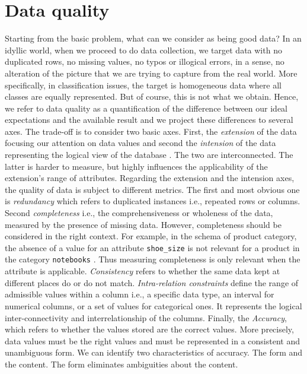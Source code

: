 \documentclass{article}
\begin{document}
\section{Data quality} %
\label{sec:Data quality}
Starting from the basic problem, what can we consider as being good data?
In an idyllic world, when we proceed to do data collection, we target data with no duplicated rows, no missing values, no typos or illogical errors, in a sense, no alteration of the picture that we are trying to capture from the real world.
More specifically, in classification issues, the target is homogeneous data where all classes are equally represented.
But of course, this is not what we obtain.
Hence, we refer to data quality as a quantification of the difference between our ideal expectations and the available result and we project these differences to several axes.
The trade-off is to consider two basic axes.
First, the \textit{extension} of the data focusing our attention on data values and second the \textit{intension} of the data representing the logical view of the database \cite{amazon}.
The two are interconnected.
The latter is harder to measure, but highly influences the applicability of the extension's range of attributes.
Regarding the extension and the intension axes, the quality of data is subject to different metrics.
The first and most obvious one is \textit{redundancy} which refers to duplicated instances i.e., repeated rows or columns.
Second \textit{completeness} i.e., the comprehensiveness or wholeness of the data, measured by the presence of missing data.
However, completeness should be considered in the right context.
For example, in the schema of product category, the absence of a value for an attribute \texttt{shoe\_size} is not relevant for a product in the category \texttt{notebooks} \cite{amazon}.
Thus measuring completeness is only relevant when the attribute is applicable.
\textit{Consistency} refers to whether the same data kept at different places do or do not match.
\textit{Intra-relation constraints} define the range of admissible values within a column i.e., a specific data type, an interval for numerical columns, or a set of values for categorical ones.
It represents the logical inter-connectivity and interrelationship of the columns.
Finally, the \textit{Accuracy}, which refers to whether the values stored are the correct values.
More precisely, data values must be the right values and must be represented in a consistent and unambiguous form.
We can identify two characteristics of accuracy.
The form and the content.
The form eliminates ambiguities about the content.
\end{document}
